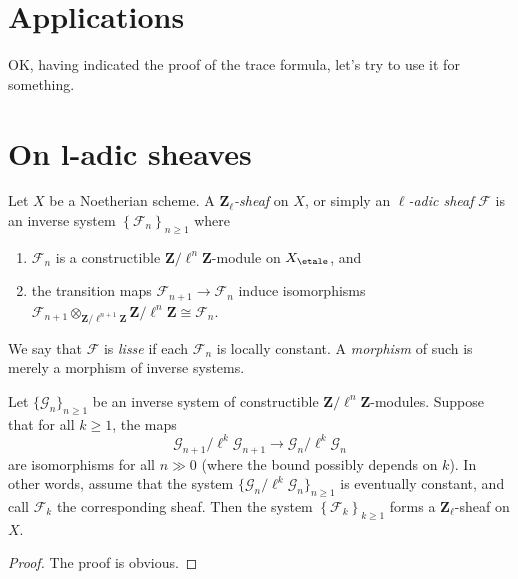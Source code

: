 \section{Applications}
\label{section-applications}

\noindent
OK, having indicated the proof of the trace formula, let's try to use it
for something.





\section{On l-adic sheaves}
\label{section-l-adic-sheaves}

\begin{definition}
\label{definition-l-adic-sheaf}
Let $X$ be a Noetherian scheme. A {\it $\mathbf{Z}_\ell$-sheaf} on $X$, or
simply an {\it $\ell$-adic sheaf} $\mathcal{F}$ is an
inverse system $\left\{\mathcal{F}_n\right\}_{n\geq 1}$ where
\begin{enumerate}
\item
$\mathcal{F}_n$ is a constructible $\mathbf{Z}/\ell^n\mathbf{Z}$-module on
$X_\etale$, and
\item
the transition maps $\mathcal{F}_{n+1}\to \mathcal{F}_n$ induce isomorphisms
$\mathcal{F}_{n+1} \otimes_{\mathbf{Z}/\ell^{n+1}\mathbf{Z}}
\mathbf{Z}/\ell^n\mathbf{Z} \cong \mathcal{F}_n$.
\end{enumerate}
We say that $\mathcal{F}$ is {\it lisse} if each $\mathcal{F}_n$ is locally
constant. A {\it morphism} of such is merely a morphism of inverse systems.
\end{definition}

\begin{lemma}
\label{lemma-eventually-constant}
Let $\{\mathcal{G}_n\}_{n\geq 1}$ be an inverse system of constructible
$\mathbf{Z}/\ell^n\mathbf{Z}$-modules.
Suppose that for all $k\geq 1$, the maps
$$
\mathcal{G}_{n+1}/\ell^k \mathcal{G}_{n+1}\to \mathcal{G}_n /\ell^k
\mathcal{G}_n
$$
are isomorphisms for all $n\gg 0$ (where the bound possibly depends on $k$).
In other words, assume that the system
$\{\mathcal{G}_n/\ell^k\mathcal{G}_n\}_{n\geq 1}$
is eventually constant, and call $\mathcal{F}_k$ the corresponding sheaf.
Then the system $\left\{\mathcal{F}_k\right\}_{k\geq 1}$ forms a
$\mathbf{Z}_\ell$-sheaf on $X$.
\end{lemma}

\begin{proof}
The proof is obvious.
\end{proof}

